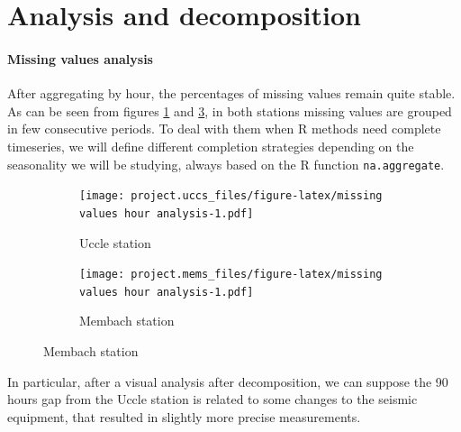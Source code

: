 \documentclass[12pt]{article}
\begin{document}
\section{Analysis and decomposition}
\paragraph{Missing values analysis}



After aggregating by hour, the percentages of missing values remain quite stable. As can be seen from figures \ref{missing-values-seconds:uccs} and \ref{missing-values-seconds:mems}, in both stations missing values are grouped in few consecutive periods.
To deal with them when R methods need complete timeseries, we will define different completion strategies depending on the seasonality we will be studying, always based on the R function \texttt{na.aggregate}.

\begin{figure}
	\caption{Missing values representation}
	\label{missing-values-seconds}
	\begin{subfigure}{.5\linewidth}
		\caption{Uccle station}
		\label{missing-values-seconds:uccs}
		\texttt{[image: project.uccs\_files/figure-latex/missing values hour analysis-1.pdf]}
	\end{subfigure}
	\begin{subfigure}{.5\linewidth}
		\caption{Membach station}
		\label{missing-values-seconds:mems}
		\texttt{[image: project.mems\_files/figure-latex/missing values hour analysis-1.pdf]}
	\end{subfigure}
\end{figure}

In particular, after a visual analysis after decomposition, we can suppose the 90 hours gap from the Uccle station is related to some changes to the seismic equipment, that resulted in slightly more precise measurements.
\end{document}
